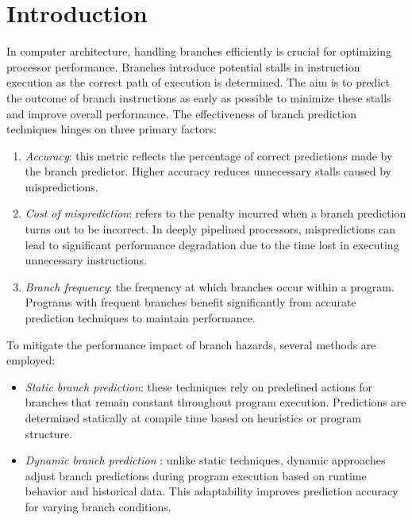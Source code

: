 \section{Introduction}

In computer architecture, handling branches efficiently is crucial for optimizing processor performance. 
Branches introduce potential stalls in instruction execution as the correct path of execution is determined. 
The aim is to predict the outcome of branch instructions as early as possible to minimize these stalls and improve overall performance. 
The effectiveness of branch prediction techniques hinges on three primary factors:
\begin{enumerate}
    \item \textit{Accuracy}: this metric reflects the percentage of correct predictions made by the branch predictor. 
        Higher accuracy reduces unnecessary stalls caused by mispredictions.
    \item \textit{Cost of misprediction}: refers to the penalty incurred when a branch prediction turns out to be incorrect. 
        In deeply pipelined processors, mispredictions can lead to significant performance degradation due to the time lost in executing unnecessary instructions.
    \item \textit{Branch frequency}: the frequency at which branches occur within a program. 
        Programs with frequent branches benefit significantly from accurate prediction techniques to maintain performance.
\end{enumerate}
To mitigate the performance impact of branch hazards, several methods are employed:
\begin{itemize}
    \item \textit{Static branch prediction}: these techniques rely on predefined actions for branches that remain constant throughout program execution.
        Predictions are determined statically at compile time based on heuristics or program structure.
    \item \textit{Dynamic branch prediction }: unlike static techniques, dynamic approaches adjust branch predictions during program execution based on runtime behavior and historical data. 
        This adaptability improves prediction accuracy for varying branch conditions.
\end{itemize}